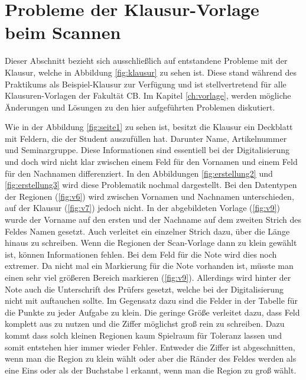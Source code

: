 \documentclass[nomenclature, oneside, 150]{HSMW-Thesis}
\begin{document}
	\section{Probleme der Klausur-Vorlage beim Scannen}\label{sc:problemevorlage}
		Dieser Abschnitt bezieht sich ausschließlich auf entstandene Probleme mit der Klausur, welche in Abbildung \ref{fig:klausur} zu sehen ist. Diese stand während des Praktikums als Beispiel-Klausur zur Verfügung und ist stellvertretend für alle Klausuren-Vorlagen der Fakultät CB. Im Kapitel \ref{ch:vorlage}, werden mögliche Änderungen und Lösungen zu den hier aufgeführten Problemen diskutiert.
		
		Wie in der Abbildung \ref{fig:seite1} zu sehen ist, besitzt die Klausur ein Deckblatt mit Feldern, die der Student auszufüllen hat. Darunter Name, Artikelnummer und Seminargruppe. Diese Informationen sind essentiell bei der Digitalisierung und doch wird nicht klar zwischen einem Feld für den Vornamen und einem Feld für den Nachnamen differenziert. In den Abbildungen \ref{fig:erstellung2} und \ref{fig:erstellung3} wird diese Problematik nochmal dargestellt. Bei den Datentypen der Regionen (\ref{fig:v6}) wird zwischen Vornamen und Nachnamen unterschieden, auf der Klausur (\ref{fig:v7}) jedoch nicht. In der abgebildeten Vorlage (\ref{fig:v9}) wurde der Vorname auf den ersten und der Nachname auf dem zweiten Strich des Feldes Namen gesetzt. Auch verleitet ein einzelner Strich dazu, über die Länge hinaus zu schreiben. Wenn die Regionen der Scan-Vorlage dann zu klein gewählt ist, können Informationen fehlen. Bei dem Feld für die Note wird dies noch extremer. Da nicht mal ein Markierung für die Note vorhanden ist, müsste man einen sehr viel größeren Bereich markieren (\ref{fig:v9}). Allerdings wird hinter der Note auch die Unterschrift des Prüfers gesetzt, welche bei der Digitalisierung nicht mit auftauchen sollte. Im Gegensatz dazu sind die Felder in der Tabelle für die Punkte zu jeder Aufgabe zu klein. Die geringe Größe verleitet dazu, dass Feld komplett aus zu nutzen und die Ziffer möglichst groß rein zu schreiben. Dazu kommt dass solch kleinen Regionen kaum Spielraum für Toleranz lassen und somit entstehen hier immer wieder Fehler. Entweder die Ziffer ist abgeschnitten, wenn man die Region zu klein wählt oder aber die Ränder des Feldes werden als eine Eins oder als der Buchstabe l erkannt, wenn man die Region zu groß wählt.
\end{document}
